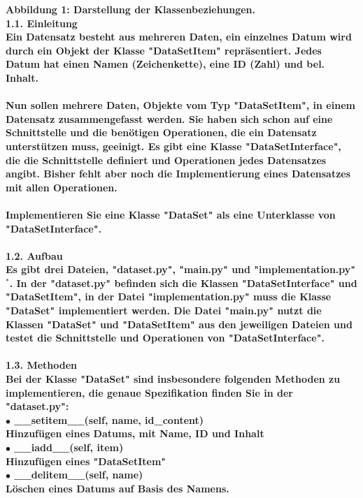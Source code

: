 \documentclass[]{article}
\begin{document}
\hspace*{3cm}\scriptsize\bf Abbildung 1: \normalfont Darstellung der Klassenbeziehungen.\normalsize\\
\bf 1.1. Einleitung \normalfont\\[0.5cm]
Ein Datensatz besteht aus mehreren Daten, ein einzelnes Datum wird durch ein Objekt der Klasse "DataSetItem" repräsentiert.
Jedes Datum hat einen Namen (Zeichenkette), eine ID (Zahl) und bel. Inhalt.\\
\\
Nun sollen mehrere Daten, Objekte vom Typ "DataSetItem", in einem Datensatz zusammengefasst werden.
Sie haben sich schon auf eine Schnittstelle und die benötigen Operationen, die ein Datensatz unterstützen muss, geeinigt.
Es gibt eine Klasse "DataSetInterface", die die Schnittstelle definiert und Operationen jedes Datensatzes angibt.
Bisher fehlt aber noch die Implementierung eines Datensatzes mit allen Operationen.\\
\\
Implementieren Sie eine Klasse "DataSet" als eine Unterklasse von "DataSetInterface".\\
\\
\bf 1.2. Aufbau \normalfont\\[0.5cm]
Es gibt drei Dateien, "dataset.py", "main.py" und "implementation.py"$^*$.
In der "dataset.py" befinden sich die Klassen "DataSetInterface" und "DataSetItem",
in der Datei "implementation.py" muss die Klasse "DataSet" implementiert werden.
Die Datei "main.py" nutzt die Klassen "DataSet" und "DataSetItem" aus den jeweiligen Dateien und testet die Schnittstelle und Operationen von "DataSetInterface".\\
\\
\bf 1.3. Methoden \normalfont\\[0.5cm]
Bei der Klasse "DataSet" sind insbesondere folgenden Methoden zu implementieren, die genaue Spezifikation finden Sie in der "dataset.py":\\
$\bullet$ \_\_setitem\_\_(self, name, id\_content)\\
\hspace*{1cm} Hinzufügen eines Datums, mit Name, ID und Inhalt\\
$\bullet$ \_\_iadd\_\_(self, item)\\
\hspace*{1cm} Hinzufügen eines "DataSetItem"\\
$\bullet$ \_\_delitem\_\_(self, name)\\
\hspace*{1cm} Löschen eines Datums auf Basis des Namens.\\
\end{document}

